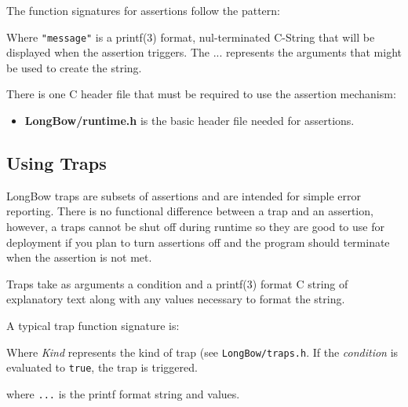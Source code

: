 The function signatures for assertions follow the pattern:


Where {\tt "message"} is a printf(3) format, nul-terminated C-String that will be displayed when the assertion triggers.  The ... represents the arguments that might be used to create the string.

There is one C header file that must be required to use the assertion mechanism:
\begin{itemize}
\item \textbf{LongBow/runtime.h} is the basic header file needed for assertions.
\end{itemize} 

\subsection {Using Traps}
LongBow traps are subsets of assertions and are intended for simple error reporting.
There is no functional difference between a trap and an assertion, however, a traps cannot be shut off during runtime so they are good to use for deployment if you plan to turn assertions off and the program should terminate when the assertion is not met.

Traps take as arguments a condition and a printf(3) format C string of explanatory text along with any values necessary to format the string.

A typical trap function signature is:


Where {\it Kind} represents the kind of trap (see {\tt LongBow/traps.h}.
If the {\it condition} is evaluated to {\tt true}, the trap is triggered.

where {\tt ...} is the printf format string and values.


